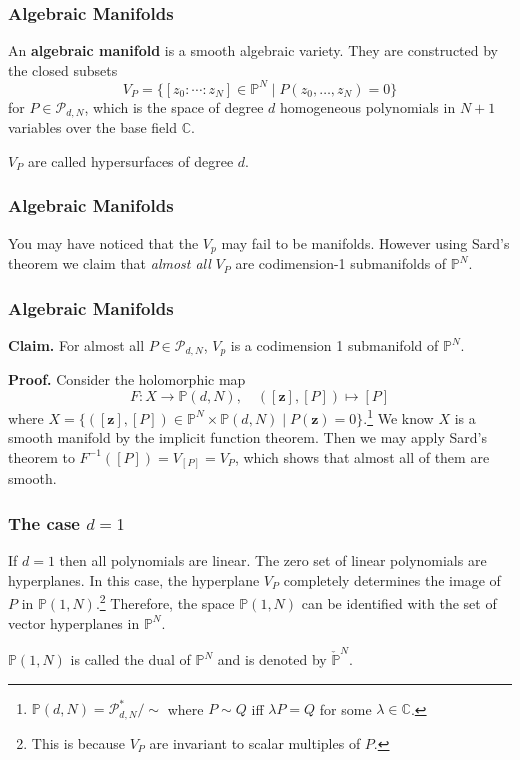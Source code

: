 \documentclass{beamer}
\begin{document}
\begin{frame}
\frametitle{Algebraic Manifolds}

An \textbf{algebraic manifold} is a smooth algebraic variety. They are constructed by the closed subsets \[V_P = \{[z_0 : \cdots : z_N] \in \mathbb{P}^N \mid P(z_0,\ldots,z_N) = 0\}\] for $P \in \mathcal{P}_{d,N}$, which is the space of degree $d$ homogeneous polynomials in $N+1$ variables over the base field $\mathbb{C}$.

\phantom{?}

$V_P$ are called hypersurfaces of degree $d$.

\end{frame}

\begin{frame}
\frametitle{Algebraic Manifolds}


You may have noticed that the $V_p$ may fail to be manifolds. However using Sard's theorem we claim that \textit{almost all} $V_P$ are codimension-1 submanifolds of $\mathbb{P}^N$.


\end{frame}

\begin{frame}
\frametitle{Algebraic Manifolds}

\textbf{Claim.} For almost all $P \in \mathcal{P}_{d,N}$, $V_p$ is a codimension 1 submanifold of $\mathbb{P}^N$.

\textbf{Proof.} Consider the holomorphic map \[F : X \to \mathbb{P}(d,N), \quad ([\mathbf{z}],[P]) \mapsto [P]\] where $X = \{([\mathbf{z}],[P])\in \mathbb{P}^N \times \mathbb{P}(d,N) \mid P(\mathbf{z}) = 0\}$.\footnote{$\mathbb{P}(d,N) = \mathcal{P}_{d,N}^*/\sim$ where $P \sim Q$ iff $\lambda P = Q$ for some $\lambda \in \mathbb{C}$.} We know $X$ is a smooth manifold by the implicit function theorem. Then we may apply Sard's theorem to $F^{-1}([P]) = V_{[P]}=V_P$, which shows that almost all of them are smooth.
\end{frame}

\begin{frame}
\frametitle{The case $d=1$}

If $d=1$ then all polynomials are linear. The zero set of linear polynomials are hyperplanes. In this case, the hyperplane $V_P$ completely determines the image of $P$ in $\mathbb{P}(1,N)$.\footnote{This is because $V_P$ are invariant to scalar multiples of $P$.} Therefore, the space $\mathbb{P}(1,N)$ can be identified with the set of vector hyperplanes in $\mathbb{P}^N$.

\phantom{?}

$\mathbb{P}(1,N)$ is called the dual of $\mathbb{P}^N$ and is denoted by $\check{\mathbb{P}}^N$.

\end{frame}
\end{document}

